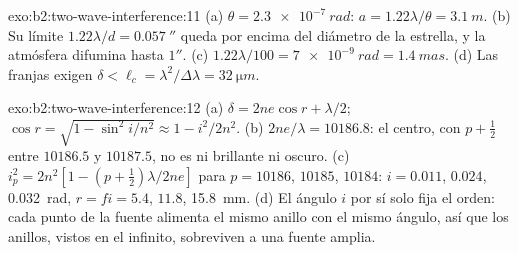\begin{solution}{exo:b2:two-wave-interference:11}
(a) $\theta = \qty{2.3e-7}{rad}$: $a = 1.22\lambda/\theta = \qty{3.1}{m}$. (b) Su límite $1.22\lambda/d =
\qty{0.057}{''}$ queda por encima del diámetro de la estrella, y la atmósfera difumina
hasta $1''$. (c) $1.22\lambda/100 = \qty{7e-9}{rad} = \qty{1.4}{mas}$. (d) Las franjas exigen
$\delta < \ell_c = \lambda^2/\Delta\lambda = \qty{32}{\micro m}$.
\end{solution}

\begin{solution}{exo:b2:two-wave-interference:12}
(a) $\delta = 2ne\cos r + \lambda/2$; $\cos r = \sqrt{1 - \sin^2i/n^2} \approx 1 - i^2/2n^2$.
(b) $2ne/\lambda = 10186.8$: el centro, con $p + \tfrac12$ entre $10186.5$ y
$10187.5$, no es ni brillante ni oscuro. (c) $i_p^2 = 2n^2[1 - (p + \tfrac12)\lambda/
2ne]$ para $p = 10186$, $10185$, $10184$: $i = 0.011$, $0.024$, \qty{0.032}{rad}, $r = fi
= 5.4$, $11.8$, \qty{15.8}{mm}. (d) El ángulo $i$ por sí solo fija el orden: cada
punto de la fuente alimenta el mismo anillo con el mismo ángulo, así que los anillos, vistos
en el infinito, sobreviven a una fuente amplia.
\end{solution}

